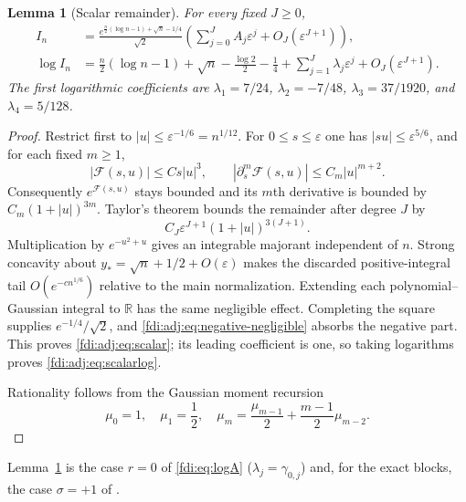 \documentclass[11pt,letterpaper]{article}
\newtheorem{lemma}[theorem]{Lemma}
\theoremstyle{remark}\newtheorem{remark}[theorem]{Remark}
\newcommand{\eps}{\varepsilon}\newcommand{\Pois}{\operatorname{Poisson}}
\begin{document}
\begin{lemma}[Scalar remainder]\label{fdi:adj:lem:scalar}
For every fixed $J\ge0$,
\begin{align}
 I_n&=\frac{e^{\frac n2(\log n-1)+\sqrt n-1/4}}{\sqrt2}
       \left(\sum_{j=0}^J A_j\eps^j+O_J(\eps^{J+1})\right),\label{fdi:adj:eq:scalar}\\
 \log I_n&=\frac n2(\log n-1)+\sqrt n-\frac{\log2}{2}-\frac14
       +\sum_{j=1}^J\lambda_j\eps^j+O_J(\eps^{J+1}).\label{fdi:adj:eq:scalarlog}
\end{align}
The first logarithmic coefficients are
$\lambda_1=7/24$, $\lambda_2=-7/48$, $\lambda_3=37/1920$, and $\lambda_4=5/128$.
\end{lemma}
\begin{proof}
Restrict first to $|u|\le\eps^{-1/6}=n^{1/12}$. For $0\le s\le\eps$ one has $|su|\le\eps^{5/6}$, and for each fixed $m\ge1$,
\[
 |\mathcal F(s,u)|\le C s|u|^3,\qquad
 |\partial_s^m\mathcal F(s,u)|\le C_m|u|^{m+2}.
\]
Consequently $e^{\mathcal F(s,u)}$ stays bounded and its $m$th derivative is bounded by $C_m(1+|u|)^{3m}$. Taylor's theorem bounds the remainder after degree $J$ by
\[
 C_J\eps^{J+1}(1+|u|)^{3(J+1)}.
\]
Multiplication by $e^{-u^2+u}$ gives an integrable majorant independent of $n$. Strong concavity about $y_*=\sqrt n+1/2+O(\eps)$ makes the discarded positive-integral tail $O(e^{-cn^{1/6}})$ relative to the main normalization. Extending each polynomial--Gaussian integral to $\mathbb R$ has the same negligible effect. Completing the square supplies $e^{-1/4}/\sqrt2$, and \eqref{fdi:adj:eq:negative-negligible} absorbs the negative part. This proves \eqref{fdi:adj:eq:scalar}; its leading coefficient is one, so taking logarithms proves \eqref{fdi:adj:eq:scalarlog}.

Rationality follows from the Gaussian moment recursion
\[
 \mu_0=1,\quad\mu_1=\frac12,\quad
 \mu_m=\frac{\mu_{m-1}}2+\frac{m-1}{2}\mu_{m-2}.
\]
\end{proof}
Lemma~\ref{fdi:adj:lem:scalar} is the case $r=0$ of \eqref{fdi:eq:logA} ($\lambda_j=\gamma_{0,j}$) and, for the exact blocks, the case $\sigma=+1$ of \cite[\texttt{t1:thm:ivforward}]{cti}.
\end{document}
